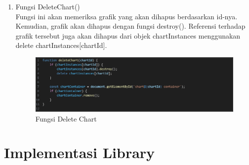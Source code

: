 \begin{enumerate}[label={\alph*.}]
	\item Fungsi DeleteChart()\\
	Fungsi ini akan memeriksa grafik yang akan dihapus berdasarkan id-nya. Kemudian, grafik akan dihapus dengan fungsi destroy(). Referensi terhadap grafik tersebut juga akan dihapus dari objek chartInstances menggunakan delete chartInstances[chartId]. 
		 \begin{figure}[H]
		\centering
		\includegraphics[width=0.8\linewidth]{gambar/Pembahasan/delete-chart.png}
		\caption{Fungsi Delete Chart}
		\label{Fungsi Delete Chart}
		\end{figure}
	\end{enumerate}
	
\section{Implementasi Library}
